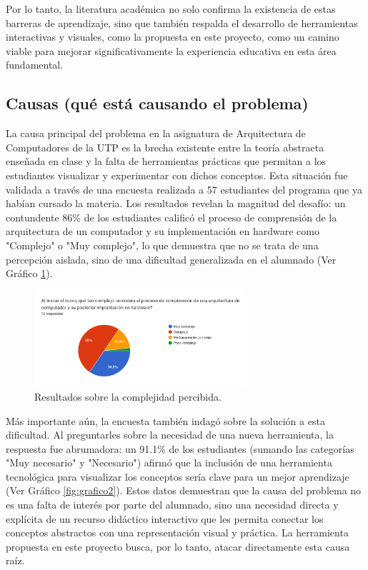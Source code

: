 \documentclass[12pt, letterpaper]{article}
\begin{document}
Por lo tanto, la literatura académica no solo confirma la existencia de estas barreras de aprendizaje, sino que también respalda el desarrollo de herramientas interactivas y visuales, como la propuesta en este proyecto, como un camino viable para mejorar significativamente la experiencia educativa en esta área fundamental.

\subsection{Causas (qué está causando el problema)}
La causa principal del problema en la asignatura de Arquitectura de Computadores de la UTP es la brecha existente entre la teoría abstracta enseñada en clase y la falta de herramientas prácticas que permitan a los estudiantes visualizar y experimentar con dichos conceptos. Esta situación fue validada a través de una encuesta realizada a 57 estudiantes del programa que ya habían cursado la materia. Los resultados revelan la magnitud del desafío: un contundente 86\% de los estudiantes calificó el proceso de comprensión de la arquitectura de un computador y su implementación en hardware como "Complejo" o "Muy complejo", lo que demuestra que no se trata de una percepción aislada, sino de una dificultad generalizada en el alumnado (Ver Gráfico \ref{fig:grafico1}).

\begin{figure}[h!]
    \centering
    \includegraphics[width=0.7\textwidth]{figura1.png}
    \caption{Resultados sobre la complejidad percibida.}
    \label{fig:grafico1}
\end{figure}

Más importante aún, la encuesta también indagó sobre la solución a esta dificultad. Al preguntarles sobre la necesidad de una nueva herramienta, la respuesta fue abrumadora: un 91.1\% de los estudiantes (sumando las categorías "Muy necesario" y "Necesario") afirmó que la inclusión de una herramienta tecnológica para visualizar los conceptos sería clave para un mejor aprendizaje (Ver Gráfico \ref{fig:grafico2}). Estos datos demuestran que la causa del problema no es una falta de interés por parte del alumnado, sino una necesidad directa y explícita de un recurso didáctico interactivo que les permita conectar los conceptos abstractos con una representación visual y práctica. La herramienta propuesta en este proyecto busca, por lo tanto, atacar directamente esta causa raíz.
\end{document}
